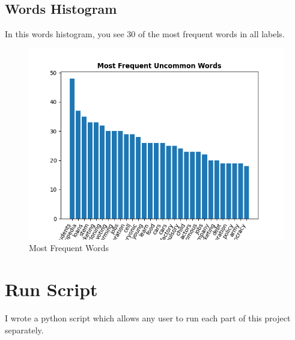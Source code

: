 \subsection{Words Histogram}
In this words histogram, you see 30 of the most frequent words in all labels.
\begin{figure}[H]
    \begin{center}
        \includegraphics[width=\linewidth]{../stats/words_histogram.png}
        \caption{Most Frequent Words}
    \end{center}
\end{figure}

\section{Run Script}
I wrote a python script which allows any user to run each part of this project separately.
